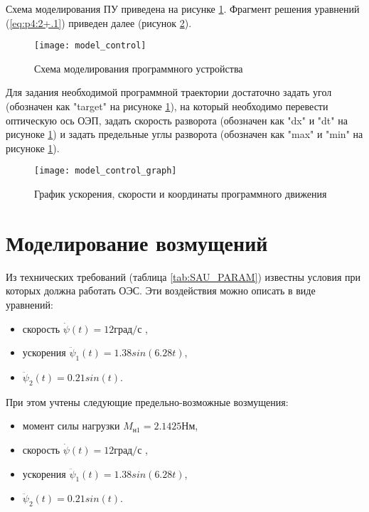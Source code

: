 Схема моделирования ПУ приведена на рисунке \ref{fig:model_control}. Фрагмент решения уравнений (\ref{eq:p4:2+.1}) приведен далее (рисунок \ref{fig:model_control_graph}).

\begin{figure}[ht]
	\centering
	\texttt{[image: model\_control]} 
	\caption{Схема моделирования программного устройства}
	\label{fig:model_control}
\end{figure}

Для задания необходимой программной траектории достаточно задать угол (обозначен как "target" на рисуноке \ref{fig:model_control}), на который  необходимо перевести оптическую ось ОЭП, задать скорость разворота (обозначен как "dx" и "dt" на рисуноке \ref{fig:model_control}) и задать предельные углы разворота (обозначен как "max" и "min" на рисуноке \ref{fig:model_control}). 

\begin{figure}
	\centering
	\texttt{[image: model\_control\_graph]}
	\caption{График ускорения, скорости и координаты программного движения}
	\label{fig:model_control_graph}
\end{figure}

\section{Моделирование возмущений} \label{ch:ch4/sect2+1}

Из технических требований (таблица \ref{tab:SAU_PARAM}) известны условия при которых должна работать ОЭС. Эти воздействия можно описать в виде уравнений:
\begin{itemize}
	\item скорость \( \dot \psi  \left( t \right) = 12 \textit{град/с} \) ,
	\item ускорения \(  \ddot \psi _{1} \left( t \right) =1.38sin \left( 6.28 t \right) \),
	\item \( \ddot \psi_2 (t) = 0.21 sin(t) \).
\end{itemize}


При этом учтены следующие предельно-возможные возмущения: 
\begin{itemize}
	\item момент силы нагрузки $M_{\textit{н1}} = 2.1425 \textit{Нм}$,
	\item скорость \( \dot \psi  \left( t \right) = 12 \textit{град/с} \) ,
	\item ускорения \(  \ddot \psi _{1} \left( t \right) =1.38sin \left( 6.28 t \right) \),
	\item \( \ddot \psi_2 (t) = 0.21 sin(t) \).
\end{itemize}

